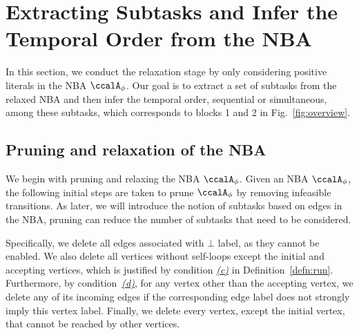 \documentclass[Afour,sageh,times]{sagej}
\newcommand{\autop}{\ccalA_{\phi}}
\begin{document}
{%

\section{Extracting Subtasks and Infer the Temporal Order from the NBA}\label{sec:app}
In this section, we conduct the relaxation stage by only considering positive literals in the NBA $\autop$. Our goal is to extract a set of subtasks from the relaxed NBA  and then infer the temporal order, sequential or simultaneous, among these subtasks, which corresponds to blocks 1 and 2 in Fig.~\ref{fig:overview}.
\subsection{{Pruning and relaxation of the NBA}}\label{sec:prune}

We begin with pruning and relaxing the NBA $\autop$. Given an NBA $\autop$, the following initial steps are taken to prune $\autop$ by removing infeasible transitions. As later, we will introduce the notion of subtasks based on edges in the NBA, pruning can reduce the number of subtasks that need to be considered.

Specifically, we delete all edges associated with $\bot$ label, as they cannot be enabled.  We also delete all vertices without self-loops except the initial and accepting vertices, which is justified by condition \hyperref[cond:c]{\it (c)} in Definition~\ref{defn:run}. Furthermore, by condition~\hyperref[cond:d]{\it (d)}, for any vertex other than the accepting vertex, we delete any of its incoming edges if the corresponding edge label does not strongly imply this vertex label. Finally, we delete every vertex, except the initial vertex, that cannot be reached by other vertices.

}
\end{document}
